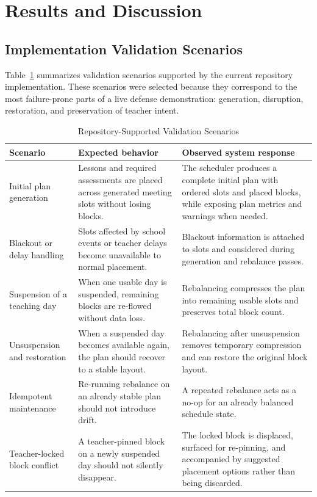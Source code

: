 \documentclass[conference]{IEEEtran}
\begin{document}
\section{Results and Discussion}

\subsection{Implementation Validation Scenarios}

Table~\ref{tab:validation} summarizes validation scenarios supported by the current
repository implementation. These scenarios were selected because they correspond
to the most failure-prone parts of a live defense demonstration: generation,
disruption, restoration, and preservation of teacher intent.

\begin{table}[t]
\centering
\caption{Repository-Supported Validation Scenarios}
\label{tab:validation}
\begin{tabular}{>{\raggedright\arraybackslash}p{}>{\raggedright\arraybackslash}p{}>{\raggedright\arraybackslash}p{}}
\toprule
Scenario & Expected behavior & Observed system response \\
\midrule
Initial plan generation & Lessons and required assessments are placed across generated meeting slots without losing blocks. & The scheduler produces a complete initial plan with ordered slots and placed blocks, while exposing plan metrics and warnings when needed. \\
\addlinespace
Blackout or delay handling & Slots affected by school events or teacher delays become unavailable to normal placement. & Blackout information is attached to slots and considered during generation and rebalance passes. \\
\addlinespace
Suspension of a teaching day & When one usable day is suspended, remaining blocks are re-flowed without data loss. & Rebalancing compresses the plan into remaining usable slots and preserves total block count. \\
\addlinespace
Unsuspension and restoration & When a suspended day becomes available again, the plan should recover to a stable layout. & Rebalancing after unsuspension removes temporary compression and can restore the original block layout. \\
\addlinespace
Idempotent maintenance & Re-running rebalance on an already stable plan should not introduce drift. & A repeated rebalance acts as a no-op for an already balanced schedule state. \\
\addlinespace
Teacher-locked block conflict & A teacher-pinned block on a newly suspended day should not silently disappear. & The locked block is displaced, surfaced for re-pinning, and accompanied by suggested placement options rather than being discarded. \\
\bottomrule
\end{tabular}
\end{table}
\end{document}
